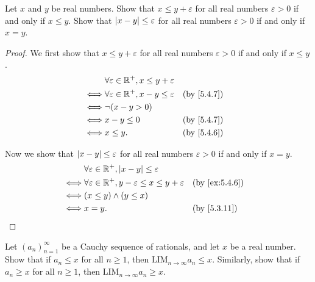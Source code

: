 \begin{ex}\label{ex:5.4.7}
  Let \(x\) and \(y\) be real numbers.
  Show that \(x \leq y + \varepsilon\) for all real numbers \(\varepsilon > 0\) if and only if \(x \leq y\).
  Show that \(\left\lvert x - y\right\rvert \leq \varepsilon\) for all real numbers \(\varepsilon > 0\) if and only if \(x = y\).
\end{ex}

\begin{proof}
  We first show that \(x \leq y + \varepsilon\) for all real numbers \(\varepsilon > 0\) if and only if \(x \leq y\).
  \begin{align*}
         & \forall \varepsilon \in \R^+, x \leq y + \varepsilon                 \\
    \iff & \forall \varepsilon \in \R^+, x - y \leq \varepsilon &  & \by{5.4.7} \\
    \iff & \lnot (x - y > 0)                                                    \\
    \iff & x - y \leq 0                                         &  & \by{5.4.7} \\
    \iff & x \leq y.                                            &  & \by{5.4.6}
  \end{align*}

  Now we show that \(\left\lvert x - y\right\rvert \leq \varepsilon\) for all real numbers \(\varepsilon > 0\) if and only if \(x = y\).
  \begin{align*}
         & \forall \varepsilon \in \R^+, \abs{x - y} \leq \varepsilon                                   \\
    \iff & \forall \varepsilon \in \R^+, y - \varepsilon \leq x \leq y + \varepsilon &  & \by{ex:5.4.6} \\
    \iff & (x \leq y) \land (y \leq x)                                                                  \\
    \iff & x = y.                                                                    &  & \by{5.3.11}
  \end{align*}
\end{proof}

\begin{ex}\label{ex:5.4.8}
  Let \((a_n)_{n = 1}^{\infty}\) be a Cauchy sequence of rationals, and let \(x\) be a real number.
  Show that if \(a_n \leq x\) for all \(n \geq 1\), then \(\text{LIM}_{n \to \infty} a_n \leq x\).
  Similarly, show that if \(a_n \geq x\) for all \(n \geq 1\), then \(\text{LIM}_{n \to \infty} a_n \geq x\).
\end{ex}


